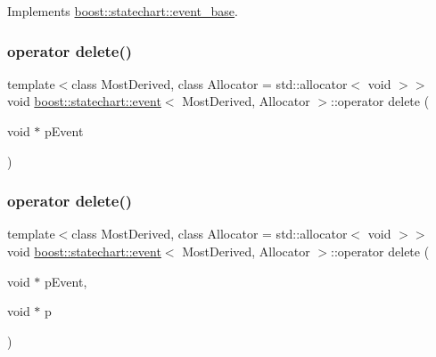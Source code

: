 Implements \mbox{\hyperlink{classboost_1_1statechart_1_1event__base_a72e40beb11e594199e6d4d62ae6c57d3}{boost\+::statechart\+::event\+\_\+base}}.

\mbox{\label{classboost_1_1statechart_1_1event_a3e373d9f7d6da95d5ce091f94ecb8bcb}} 
\subsubsection{\texorpdfstring{operator delete()}{operator delete()}\hspace{0.1cm}{\footnotesize\ttfamily [1/2]}}
{\footnotesize\ttfamily template$<$class Most\+Derived, class Allocator = std\+::allocator$<$ void $>$$>$ \\
void \mbox{\hyperlink{classboost_1_1statechart_1_1event}{boost\+::statechart\+::event}}$<$ Most\+Derived, Allocator $>$\+::operator delete (\begin{DoxyParamCaption}\item[{void $\ast$}]{p\+Event }\end{DoxyParamCaption})\hspace{0.3cm}{\ttfamily [inline]}}

\mbox{\label{classboost_1_1statechart_1_1event_aab40cf2303a7ffb4ba3b4dcbb33ba1a4}} 
\subsubsection{\texorpdfstring{operator delete()}{operator delete()}\hspace{0.1cm}{\footnotesize\ttfamily [2/2]}}
{\footnotesize\ttfamily template$<$class Most\+Derived, class Allocator = std\+::allocator$<$ void $>$$>$ \\
void \mbox{\hyperlink{classboost_1_1statechart_1_1event}{boost\+::statechart\+::event}}$<$ Most\+Derived, Allocator $>$\+::operator delete (\begin{DoxyParamCaption}\item[{void $\ast$}]{p\+Event,  }\item[{void $\ast$}]{p }\end{DoxyParamCaption})\hspace{0.3cm}{\ttfamily [inline]}}

